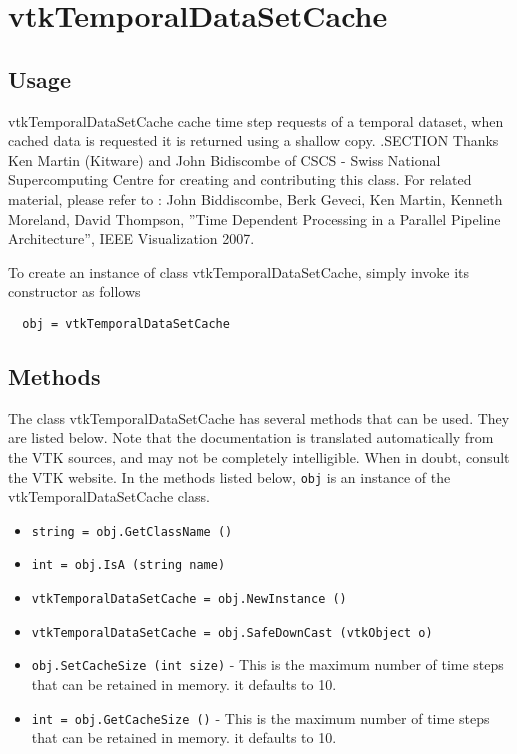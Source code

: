 \section{vtkTemporalDataSetCache}

\subsection{Usage}

 vtkTemporalDataSetCache cache time step requests of a temporal dataset,
 when cached data is requested it is returned using a shallow copy.
 .SECTION Thanks
 Ken Martin (Kitware) and John Bidiscombe of 
 CSCS - Swiss National Supercomputing Centre
 for creating and contributing this class.
 For related material, please refer to : 
 John Biddiscombe, Berk Geveci, Ken Martin, Kenneth Moreland, David Thompson,
 ''Time Dependent Processing in a Parallel Pipeline Architecture'', 
 IEEE Visualization 2007. 

To create an instance of class vtkTemporalDataSetCache, simply
invoke its constructor as follows
\begin{verbatim}
  obj = vtkTemporalDataSetCache
\end{verbatim}
\subsection{Methods}

The class vtkTemporalDataSetCache has several methods that can be used.
  They are listed below.
Note that the documentation is translated automatically from the VTK sources,
and may not be completely intelligible.  When in doubt, consult the VTK website.
In the methods listed below, \verb|obj| is an instance of the vtkTemporalDataSetCache class.
\begin{itemize}
\item  \verb|string = obj.GetClassName ()|

\item  \verb|int = obj.IsA (string name)|

\item  \verb|vtkTemporalDataSetCache = obj.NewInstance ()|

\item  \verb|vtkTemporalDataSetCache = obj.SafeDownCast (vtkObject o)|

\item  \verb|obj.SetCacheSize (int size)| -  This is the maximum number of time steps that can be retained in memory.
 it defaults to 10.

\item  \verb|int = obj.GetCacheSize ()| -  This is the maximum number of time steps that can be retained in memory.
 it defaults to 10.

\end{itemize}
